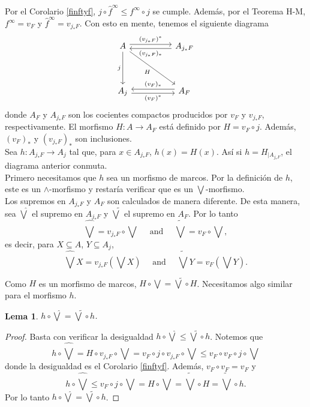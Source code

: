 \documentclass[11pt]{amsart}
\theoremstyle{plain}
\newtheorem{lem}[thm]{Lema}
\theoremstyle{definition}
\begin{document}
Por el Corolario \ref{finftyf}, $j\circ \hat{f}^\infty\leq f^\infty\circ j$ se cumple. Además, por el Teorema H-M, $f^\infty=v_F$ y $\hat{f}^\infty=v_{j_*F}$. 
Con esto en mente, tenemos el siguiente diagrama
\[\begin{tikzcd}
	A && {A_{j_*F}} \\
	\\
	{A_j} && {A_F}
	\arrow["{(v_{j_*F})^*}", shift left, from=1-1, to=1-3]
	\arrow["j"', from=1-1, to=3-1]
	\arrow["H"', from=1-1, to=3-3]
	\arrow["{(v_{j_*F})_*}", shift left, from=1-3, to=1-1]
	\arrow["{(v_F)^*}"', shift right, from=3-1, to=3-3]
	\arrow["{(v_F)_*}"', shift right, from=3-3, to=3-1]
\end{tikzcd}\]
donde $A_F$ y $A_{j_*F}$ son los cocientes compactos producidos por $v_F$ y $v_{j_*F}$, respectivamente. El morfismo $H\colon A\to A_F$ está definido por $H=v_F\circ j$. Además, $(v_F)_*$ y $(v_{j_*F})_*$ son inclusiones.\\

Sea $h\colon A_{j_*F}\to A_j$ tal que, para $x\in A_{j_*F}$, $h(x)=H(x)$. Así si $h=H_{\mid{A_{j_*F}}}$, el diagrama anterior conmuta.\\

Primero necesitamos que $h$ sea un morfismo de marcos. Por la definición de $h$, este es un $\wedge$-morfismo y restaría verificar que es un $\bigvee$-morfismo.\\

Los supremos en $A_{j_*F}$ y $A_F$ son calculados de manera diferente. De esta manera, sea $\hat{\bigvee}$ el supremo en $A_{j_*F}$ y $\tilde{\bigvee}$ el supremo en $A_F$. Por lo tanto
\[
\hat{\bigvee}=v_{j_*F}\circ \bigvee\quad\mbox{ and }\quad \tilde{\bigvee}=v_{F}\circ \bigvee,
\] 
es decir, para $X\subseteq A$, $Y\subseteq A_j$,
\[
	\hat{\bigvee}X=v_{j_*F}(\bigvee X)\quad\mbox{ and }\quad \tilde{\bigvee}Y=v_{F}(\bigvee Y).
\]

Como $H$ es un morfismo de marcos, $H\circ \bigvee=\tilde{\bigvee}\circ H$. Necesitamos algo similar para el morfismo $h$.

\begin{lem}\label{bigvee g}
$h\circ \hat{\bigvee}=\tilde{\bigvee}\circ h$.
\end{lem}

\begin{proof}
Basta con verificar la desigualdad $h\circ \hat{\bigvee}\leq \tilde{\bigvee}\circ h$. Notemos que
\[
h\circ \hat{\bigvee}=H\circ v_{j_*F}\circ \bigvee=v_F\circ j\circ v_{j_*F}\circ \bigvee\leq v_F\circ v_F\circ j\circ \bigvee
\]
donde la desigualdad es el Corolario \ref{finftyf}. Además, $v_F\circ v_F=v_F$ y
\[
h\circ\hat{\bigvee}\leq v_F\circ j\circ \bigvee =H\circ \bigvee=\tilde{\bigvee}\circ H=\tilde{\bigvee}\circ h.
\]
Por lo tanto $h\circ\hat{\bigvee}=\tilde{\bigvee}\circ h$.
\end{proof}
\end{document}
